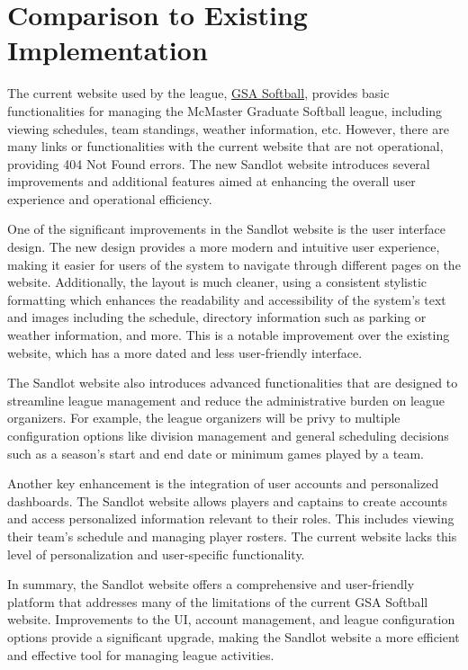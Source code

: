 \documentclass[12pt, titlepage]{article}
\begin{document}
\section{Comparison to Existing Implementation}	

The current website used by the league, \href{https://www.gsasoftball.ca/}{GSA Softball},
provides basic functionalities for managing the McMaster Graduate Softball league, including
viewing schedules, team standings, weather information, etc. However, there are many links
or functionalities with the current website that are not operational, providing 404 Not Found errors.
The new Sandlot website introduces several improvements and additional features aimed at
enhancing the overall user experience and operational efficiency.

One of the significant improvements in the Sandlot website is the user interface design.
The new design provides a more modern and intuitive user experience, making it easier for
users of the system to navigate through different pages on the website. Additionally, the
layout is much cleaner, using a consistent stylistic formatting which enhances the readability
and accessibility of the system's text and images including the schedule, directory information
such as parking or weather information, and more. This is a notable improvement over the
existing website, which has a more dated and less user-friendly interface.

The Sandlot website also introduces advanced functionalities that are designed to streamline
league management and reduce the administrative burden on league organizers. For example, the
league organizers will be privy to multiple configuration options like division management and
general scheduling decisions such as a season's start and end date or minimum games played
by a team.

Another key enhancement is the integration of user accounts and personalized dashboards.
The Sandlot website allows players and captains to create accounts and access personalized
information relevant to their roles. This includes viewing their team's schedule and
managing player rosters. The current website lacks this level of personalization and
user-specific functionality.

In summary, the Sandlot website offers a comprehensive and user-friendly platform that
addresses many of the limitations of the current GSA Softball website. Improvements to the UI,
account management, and league configuration options provide a significant upgrade,
making the Sandlot website a more efficient and effective tool for managing league activities.
\end{document}
